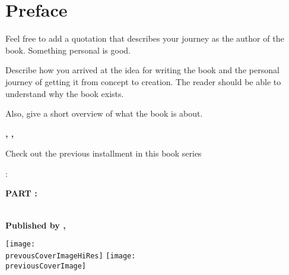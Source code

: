 

\chapter{Preface}\label{preface:cha}

\begin{myquotation}
Feel free to add a quotation that describes your journey as the author of the book. Something personal is good.\end{myquotation}

Describe how you arrived at the idea for writing the book and the personal journey of getting it from concept to creation. The reader should be able to understand why the book exists.

Also, give a short overview of what the book is about.

\noindent \textbf{\yourName}

\textbf{\yourCity, \yourCountry, \prefaceDate}



\hfil{}\hfil

\ifseries

\begin{center}
	
Check out the previous installment in this book series \bfseries \sffamily \LARGE \titleOfTheBookSeries\par:

\bfseries \Large PART \partPreviousPart: \titlePreviousPart\par
{}

~\\
\bfseries \small Published by \mypublishingcompany, \mypublishingcompanylocation\par

\ifxetex
    \texttt{[image: \\prevousCoverImageHiRes]}
\else
    \texttt{[image: \\previousCoverImage]}
\fi
\end{center}
\fi
